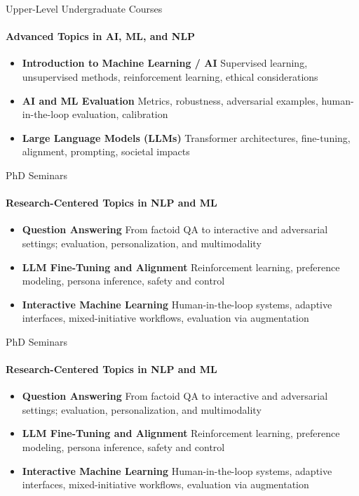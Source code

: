\documentclass[compress]{beamer}
\begin{document}
\begin{frame}{Upper-Level Undergraduate Courses}
\framesubtitle{Advanced Topics in AI, ML, and NLP}
\begin{itemize}
  \item \textbf{Introduction to Machine Learning / AI}  
        Supervised learning, unsupervised methods, reinforcement learning, ethical considerations

  \item \textbf{AI and ML Evaluation}  
        Metrics, robustness, adversarial examples, human-in-the-loop evaluation, calibration

  \item \textbf{Large Language Models (LLMs)}  
        Transformer architectures, fine-tuning, alignment, prompting, societal impacts
\end{itemize}
\end{frame}


\begin{frame}{PhD Seminars}
\framesubtitle{Research-Centered Topics in NLP and ML}
\begin{itemize}
  \item \textbf{Question Answering}  
        From factoid QA to interactive and adversarial settings; evaluation, personalization, and multimodality

  \item \textbf{LLM Fine-Tuning and Alignment}  
        Reinforcement learning, preference modeling, persona inference, safety and control

  \item \textbf{Interactive Machine Learning}  
        Human-in-the-loop systems, adaptive interfaces, mixed-initiative workflows, evaluation via augmentation
\end{itemize}
\end{frame}


\begin{frame}{PhD Seminars}
\framesubtitle{Research-Centered Topics in NLP and ML}
\begin{itemize}
  \item \textbf{Question Answering}  
        From factoid QA to interactive and adversarial settings; evaluation, personalization, and multimodality

  \item \textbf{LLM Fine-Tuning and Alignment}  
        Reinforcement learning, preference modeling, persona inference, safety and control

  \item \textbf{Interactive Machine Learning}  
        Human-in-the-loop systems, adaptive interfaces, mixed-initiative workflows, evaluation via augmentation
\end{itemize}
\end{frame}
\end{document}
